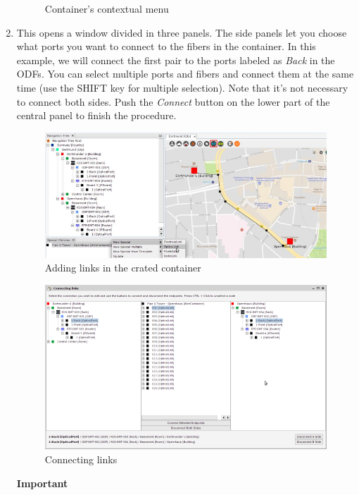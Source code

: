 \documentclass[a4paper]{article}
\begin{document}
\begin{enumerate}
\begin{figure}[h!]
						\caption{Container's contextual menu}
						\label{fig:l1_example_2_container_context_menu}
					\end{figure}
					\item This opens a window divided in three panels. The side panels let you choose what ports you want to connect to the fibers in the container. In this example, we will connect the first pair to the ports labeled as \textit{Back} in the ODFs. You can select multiple ports and fibers and connect them at the same time (use the SHIFT key for multiple selection). Note that it's not necessary to connect both sides. Push the \textit{Connect} button on the lower part of the central panel to finish the procedure.
					\begin{figure}[h!]
						\centering
						\includegraphics[width=0.9\linewidth]{img/l1_example_2_add_links.png}
						\caption{Adding links in the crated container}
						\label{fig:l1_example_2_add_links}
					\end{figure}
					\begin{figure}[h!]
						\centering
						\includegraphics[width=0.9\linewidth]{img/l1_example_2_connect_links.png}
						\caption{Connecting links}
						\label{fig:l1_example_2_connect_links}
					\end{figure}
					\begin{framed} {\large \textbf{Important}}

\end{framed}
\end{enumerate}
\end{document}
